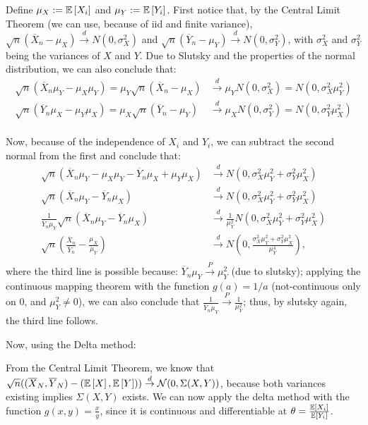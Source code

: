 \documentclass[12pt]{paper}
\begin{document}
Define $\mu_X:=\mathbb{E} \left [ X_i \right ]$ and $\mu_Y:=\mathbb{E} \left [ Y_i \right ]$. First notice that, by
the Central Limit Theorem (we can use, because of iid and finite variance),
$\sqrt{n}(\overline{X}_n-\mu_X)\overset{d}{\to}N(0,\sigma^2_X)$ and
$\sqrt{n}(\overline{Y}_n-\mu_Y)\overset{d}{\to}N(0,\sigma^2_Y)$, with
$\sigma^2_X$ and $\sigma^2_Y$ being the variances of $X$ and $Y$. Due to Slutsky
and the properties of the normal distribution, we can also conclude
that:
\begin{equation}
\begin{split}
  \sqrt{n}(\overline{X}_n\mu_Y-\mu_X\mu_Y)=\mu_Y\sqrt{n}(\overline{X}_n-\mu_X)&\overset{d}{\to}\mu_Y N(0,\sigma^2_X)=N(0,\sigma^2_X\mu_Y^2)\\
  \sqrt{n}(\overline{Y}_n\mu_X-\mu_Y\mu_X)=\mu_X\sqrt{n}(\overline{Y}_n-\mu_Y)&\overset{d}{\to}\mu_X N(0,\sigma^2_Y)=N(0,\sigma^2_Y\mu_X^2)\\
\end{split}
\end{equation}

Now, because of the independence of $X_i$ and $Y_i$, we can subtract
the second normal from the first and conclude that:
\begin{equation}
\begin{split}
  \sqrt{n}(\overline{X}_n\mu_Y-\mu_X\mu_Y-\overline{Y}_n\mu_X+\mu_Y\mu_X)&\overset{d}{\to}N(0,\sigma^2_X\mu_Y^2+\sigma^2_Y\mu_X^2)\\
  \sqrt{n}(\overline{X}_n\mu_Y-\overline{Y}_n\mu_X)&\overset{d}{\to}N(0,\sigma^2_X\mu_Y^2+\sigma^2_Y\mu_X^2)\\
  \frac{1}{\overline{Y}_n\mu_Y}\sqrt{n}(\overline{X}_n\mu_Y-\overline{Y}_n\mu_X)&\overset{d}{\to}\frac{1}{\mu_Y^2}N(0,\sigma^2_X\mu_Y^2+\sigma^2_Y\mu_X^2)\\
  \sqrt{n}(\frac{\overline{X}_n}{\overline{Y}_n}-\frac{\mu_X}{\mu_Y})&\overset{d}{\to}N(0,\frac{\sigma^2_X\mu_Y^2+\sigma^2_Y\mu_X^2}{\mu_Y^4}),\\
\end{split}
\end{equation}
\noindent where the third line is possible because:
$\overline{Y}_n\mu_Y\overset{P}{\to}\mu_Y^2$ (due to slutsky); applying the
continuous mapping theorem with the function $g(a)=1/a$
(not-continuous only on 0, and $\mu_Y^2\ne0$), we can also conclude that
$\frac{1}{\overline{Y}_n\mu_Y}\overset{P}{\to}\frac{1}{\mu_Y^2}$; thus, by
slutsky again, the third line follows.

Now, using the Delta method:

From the Central Limit Theorem, we know that
$\sqrt{n} ( (\overline{ X }_{N},\overline{ Y }_{N}) - (\mathbb{E} \left [ X \right ],\mathbb{E} \left [ Y \right ])) \overset{d}{\to} \mathcal{N}(
0, \Sigma(X,Y))$, because both variances existing implies $\Sigma(X,Y)$ exists. We can now apply the delta method with the function $g(x,y) = \frac{x}{y}$, since it is continuous and differentiable at $\theta=\frac{\mathbb{E} \left [ X_i \right ]}{\mathbb{E} \left [ Y_i \right ]}$.
\end{document}
